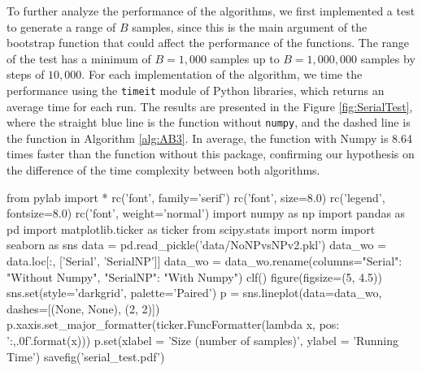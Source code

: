 \documentclass[11pt]{article}
\begin{document}
\medskip

To further analyze the performance of the algorithms, we first implemented a test to generate a range of $B$ samples, since
this is the main argument of the bootstrap function that could affect the performance of the functions. The range of the test
has a minimum of $B = 1,000$ samples up to $B = 1,000,000$ samples by steps of $10,000$. For each implementation of the
algorithm, we time the performance using the \texttt{timeit} module of Python libraries, which returns an average time for
each run. The results are presented in the Figure \ref{fig:SerialTest}, where the straight blue line is the function
without \texttt{numpy}, and the dashed line is the function in Algorithm \ref{alg:AB3}. In average, the function with Numpy
is 8.64 times faster than the function without this package, confirming our hypothesis on the difference of the time complexity
between both algorithms.

\medskip

\begin{pycode}
from pylab import *
rc('font', family='serif')
rc('font', size=8.0)
rc('legend', fontsize=8.0)
rc('font', weight='normal')
import numpy as np
import pandas as pd
import matplotlib.ticker as ticker
from scipy.stats import norm
import seaborn as sns
data = pd.read_pickle('data/NoNPvsNPv2.pkl')
data_wo = data.loc[:, ['Serial', 'SerialNP']]
data_wo = data_wo.rename(columns={"Serial": "Without Numpy", "SerialNP": "With Numpy"})
clf()
figure(figsize=(5, 4.5))
sns.set(style='darkgrid', palette='Paired')
p = sns.lineplot(data=data_wo, dashes=[(None, None), (2, 2)])
p.xaxis.set_major_formatter(ticker.FuncFormatter(lambda x, pos: '{:,.0f}'.format(x)))
p.set(xlabel = 'Size (number of samples)', ylabel = 'Running Time')
savefig('serial_test.pdf')
\end{pycode}
\end{document}
